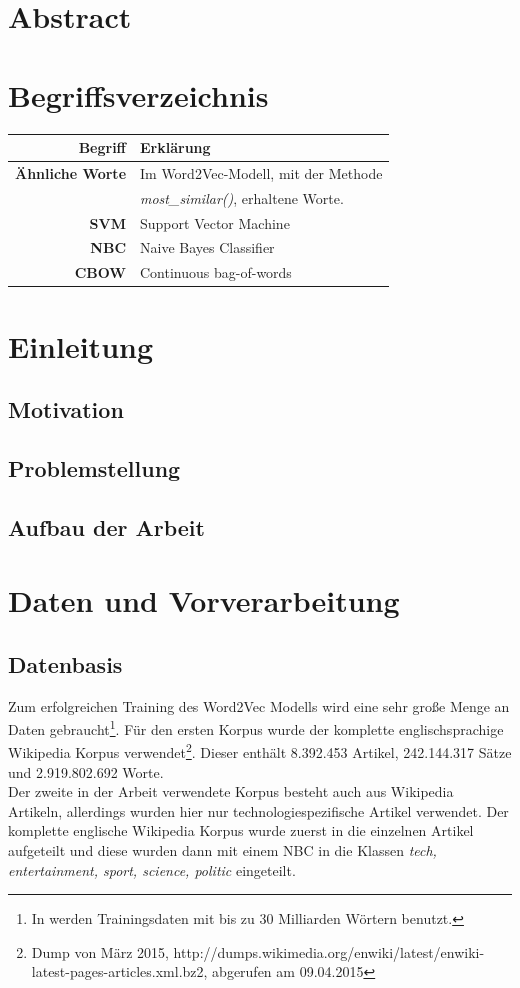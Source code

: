 \documentclass[12pt,a4paper]{report}
\begin{document}
\chapter*{Abstract}
\newpage
\tableofcontents
\newpage
\chapter*{Begriffsverzeichnis}
	\begin{tabular}{r|l}	
	\textbf{Begriff} & Erklärung\\
	\hline	
	\textbf{Ähnliche Worte} & Im Word2Vec-Modell, mit der Methode\\
	& \textit{most\_similar()}, erhaltene Worte.\\
	\textbf{SVM} & Support Vector Machine\\
	\textbf{NBC} & Naive Bayes Classifier\\
	\textbf{CBOW} & Continuous bag-of-words\\

\end{tabular}
\newpage
{}
\chapter{Einleitung}
	\section{Motivation}
	
	\section{Problemstellung}
	\section{Aufbau der Arbeit}

\newpage
\chapter{Daten und Vorverarbeitung}
	\section{Datenbasis}
	Zum erfolgreichen Training des Word2Vec Modells wird eine sehr große Menge an Daten gebraucht\footnote{In \cite{DBLP:journals/corr/MikolovSCCD13} werden Trainingsdaten mit bis zu 30 Milliarden Wörtern benutzt.}. 
	Für den ersten Korpus wurde der komplette englischsprachige Wikipedia Korpus verwendet\footnote{Dump von März 2015, http://dumps.wikimedia.org/enwiki/latest/enwiki-latest-pages-articles.xml.bz2, abgerufen am 09.04.2015}. Dieser enthält 8.392.453 Artikel, 242.144.317 Sätze und 2.919.802.692 Worte.\\
	Der zweite in der Arbeit verwendete Korpus besteht auch aus Wikipedia Artikeln, allerdings wurden hier nur technologiespezifische Artikel verwendet. Der komplette englische Wikipedia Korpus wurde zuerst in die einzelnen Artikel aufgeteilt und diese wurden dann mit einem NBC in die Klassen \textit{tech, entertainment, sport, science, politic} eingeteilt.\\
	
\end{document}
